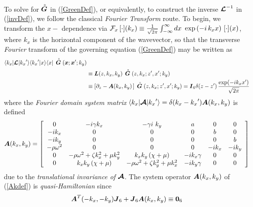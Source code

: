 \documentclass[11pt,a4paper]{article}
\newcommand{\CB}[1]{\mbox{\boldmath$\cal #1$\unboldmath}}
\newcommand{\bmi}[1]{\mbox{\boldmath$\mit #1$\unboldmath}}
\newcommand{\rf}[1]{\stackrel{\scriptscriptstyle _{\,\,\circ}}{ #1}}
\begin{document}
To solve for $\rf{\bmi  G}$ in (\ref{GreenDef}), or equivalently, to construct
the
inverse  ${{\CB L}}^{-1}$ in (\ref{invDef}), we follow the
classical {\em Fourier Transform\/} route. To begin, we transform the $x-$
dependence via ${\cal F}_{x}\, [\cdot]({k}_{x})\equiv \frac{1}{\sqrt{2
\pi}}\int_{-\infty }^{ \infty
}dx\ \exp \left({-i\, {k}_{x} x}\right)\, [\cdot](x)$, where  ${k}_{x}$ is the
horizontal
component
of the wavevector,
so that the transverse {\em Fourier\/} transform of the governing equation
(\ref{GreenDef})
may be written as
\begin{align}	\label{FLdef}
\langle { {k}_{x}} | {\CB L }| { {k}_{x}}^{\prime}\rangle
\langle { {k}_{x}}^{\prime}| x\rangle\langle x| \,\rf{\bmi
G}({\bmi x};{\bmi x}^{\prime};k_y)&\nonumber\\
&\equiv{\bmi  L}(z,{k}_{x},{k}_{y}) \,\rf{\bmi  G}(z,{k}_{x};z^{\prime},x^{\prime};k_y)\nonumber\\
&\equiv \left[\partial_z -{\bmi  A}({k}_{x},{k}_{y})\,  \right]\,\rf{\bmi
G}(z,{k}_{x};z^{\prime},x^{\prime};k_y)={\bmi  I}_{6}
	\delta(z-z^{\prime}) \, \frac{\exp(-i {k}_{x} x^{\prime})}{\sqrt{2 \pi}}
\end{align}
where the {\em Fourier domain system matrix\/} $\langle { {k}_{x}} | {\CB A }|
{ {k}_{x}}^{\prime}\rangle= \delta({ {k}_{x}}-{ {k}_{x}}^{\prime}) {\bmi
A}({k}_{x},{k}_{y})$ is defined
\begin{equation}	\label{Akdef}
	{\bmi  A}({k}_{x},{k}_{y})=\left[{\begin{array}{cccccc}
0&-i \gamma {  k}_{  x}&
 - \gamma   i\ {k}_{y}&a&0&0\\ -i{k}_{x}&0&0&0&b&0\\
-i{k}_{y}&0&0&0&0&b\\ - \rho {\omega }^{  2}&
0&0&0&-i{k}_{x}&-i{k}_{y}\\
0&- \rho {\omega }^{  2}  +
\zeta {  k}_{  x}^{  2}  + \mu {
k}_{  y}^{  2}&{  k}_{  x}{  k}_{
 y}\left({\chi   + \mu }\right)&  -i{k}_{x} \gamma
&  0&0\\ 0&{k}_{x}{k}_{y}\left({ \chi   + \mu
}\right)&- \rho {\omega }^{  2}  + \zeta {
k}_{  y}^{  2}  + \mu {  k}_{
x}^{  2}&  -i{k}_{y} \gamma &  0&0\end{array}}\right]
\end{equation}
due to the {\em translational invariance of\/} ${\CB A }$.
The system operator ${\bmi  A}({k}_{x},{k}_{y})$ of
(\ref{Akdef}) is {\em quasi-Hamiltonian\/} since
\begin{equation} \label{ATdef}
{\bmi  A}^{T}(-{k}_{x},-{k}_{y}){\bmi  J}_6 + {\bmi  J}_6 {\bmi
A}({k}_{x},{k}_{y}) \equiv {\bf 0}_6
\end{equation}
\end{document}
